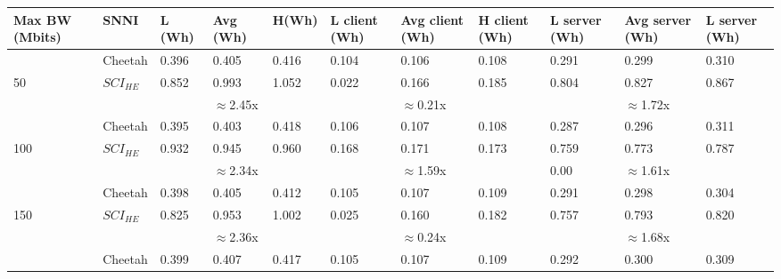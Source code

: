 \begin{tabular}{lllllllllll}
Max BW (Mbits)                                & SNNI    & L (Wh) & Avg (Wh) & H(Wh) & L client (Wh) & Avg client (Wh) & H client (Wh) & L server (Wh) & Avg server (Wh) & L server (Wh) \\ \hline
                                              & Cheetah & 0.396  & 0.405    & 0.416 & 0.104         & 0.106           & 0.108         & 0.291         & 0.299           & 0.310         \\
50                                            & $SCI_{HE}$ & 0.852  & 0.993    & 1.052 & 0.022         & 0.166           & 0.185         & 0.804         & 0.827           & 0.867         \\ \cline{3-11} 
                                              &         &        & $\approx$2.45x    &       &               & $\approx$0.21x           &               &               & $\approx$1.72x           &               \\ \hline
                                              & Cheetah & 0.395  & 0.403    & 0.418 & 0.106         & 0.107           & 0.108         & 0.287         & 0.296           & 0.311         \\
100                                           & $SCI_{HE}$ & 0.932  & 0.945    & 0.960 & 0.168         & 0.171           & 0.173         & 0.759         & 0.773           & 0.787         \\ \cline{3-11} 
                                              &         &        & $\approx$2.34x    &       &               & $\approx$1.59x           &               & 0.00          & $\approx$1.61x           &               \\ \hline
                                              & Cheetah & 0.398  & 0.405    & 0.412 & 0.105         & 0.107           & 0.109         & 0.291         & 0.298           & 0.304         \\
150                                           & $SCI_{HE}$ & 0.825  & 0.953    & 1.002 & 0.025         & 0.160           & 0.182         & 0.757         & 0.793           & 0.820         \\ \cline{3-11} 
                                              &         &        & $\approx$2.36x    &       &               & $\approx$0.24x           &               &               & $\approx$1.68x           &               \\ \hline
                                              & Cheetah & 0.399  & 0.407    & 0.417 & 0.105         & 0.107           & 0.109         & 0.292         & 0.300           & 0.309         \\

\end{tabular}
